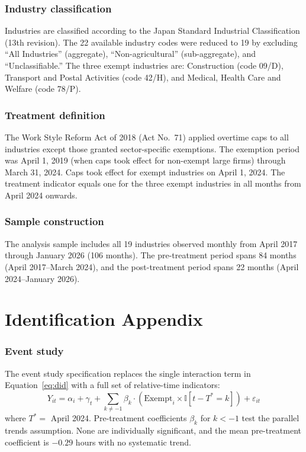 \documentclass[12pt]{article}
\newcommand{\ind}{\mathbb{I}}
\begin{document}
\subsubsection*{Industry classification} Industries are classified according to the Japan Standard Industrial Classification (13th revision). The 22 available industry codes were reduced to 19 by excluding ``All Industries'' (aggregate), ``Non-agricultural'' (sub-aggregate), and ``Unclassifiable.'' The three exempt industries are: Construction (code 09/D), Transport and Postal Activities (code 42/H), and Medical, Health Care and Welfare (code 78/P).

\subsubsection*{Treatment definition} The Work Style Reform Act of 2018 (Act No.~71) applied overtime caps to all industries except those granted sector-specific exemptions. The exemption period was April 1, 2019 (when caps took effect for non-exempt large firms) through March 31, 2024. Caps took effect for exempt industries on April 1, 2024. The treatment indicator equals one for the three exempt industries in all months from April 2024 onwards.

\subsubsection*{Sample construction} The analysis sample includes all 19 industries observed monthly from April 2017 through January 2026 (106 months). The pre-treatment period spans 84 months (April 2017--March 2024), and the post-treatment period spans 22 months (April 2024--January 2026).

\section{Identification Appendix}

\subsubsection*{Event study} The event study specification replaces the single interaction term in Equation~\ref{eq:did} with a full set of relative-time indicators:
\begin{equation}
Y_{it} = \alpha_i + \gamma_t + \sum_{k \neq -1} \beta_k \cdot (\text{Exempt}_i \times \ind[t - T^* = k]) + \varepsilon_{it}
\end{equation}
where $T^* =$ April 2024. Pre-treatment coefficients $\beta_k$ for $k < -1$ test the parallel trends assumption. None are individually significant, and the mean pre-treatment coefficient is $-0.29$ hours with no systematic trend.
\end{document}
